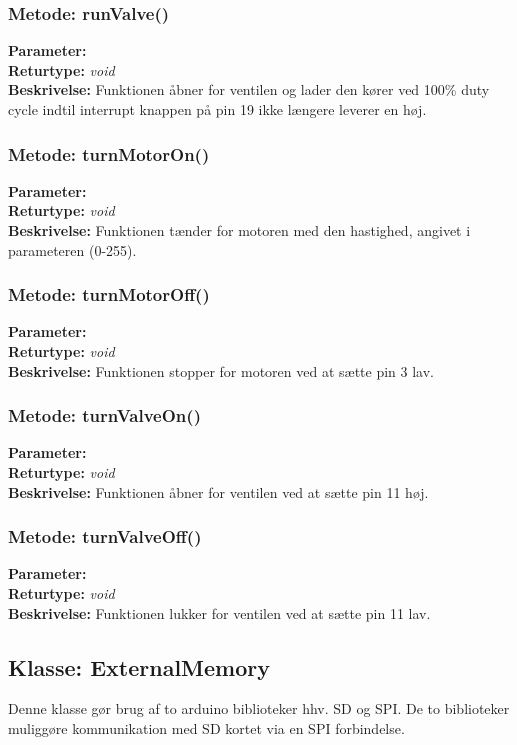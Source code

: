 \subsubsection{Metode: runValve()}
\textbf{Parameter: } 
\\ \textbf{Returtype: } \textit{void}
\\ \textbf{Beskrivelse: }  Funktionen åbner for ventilen og lader den kører ved 100\% duty cycle indtil interrupt knappen på pin 19 ikke længere leverer en høj.

\subsubsection{Metode: turnMotorOn()}
\textbf{Parameter: } 
\\ \textbf{Returtype: } \textit{void}
\\ \textbf{Beskrivelse: } Funktionen tænder for motoren med den hastighed, angivet i parameteren (0-255).

\subsubsection{Metode: turnMotorOff()}
\textbf{Parameter: } 
\\ \textbf{Returtype: } \textit{void}
\\ \textbf{Beskrivelse: }   Funktionen stopper for motoren ved at sætte pin 3 lav.

\subsubsection{Metode: turnValveOn()}
\textbf{Parameter: } 
\\ \textbf{Returtype: } \textit{void}
\\ \textbf{Beskrivelse: }  Funktionen åbner for ventilen ved at sætte pin 11 høj.

\subsubsection{Metode: turnValveOff()}
\textbf{Parameter: } 
\\ \textbf{Returtype: } \textit{void}
\\ \textbf{Beskrivelse: }  Funktionen lukker for ventilen ved at sætte pin 11 lav.

\subsection{Klasse: ExternalMemory}
Denne klasse gør brug af to arduino biblioteker hhv. SD og SPI.  De to biblioteker muliggøre kommunikation med SD kortet via en SPI forbindelse. 

